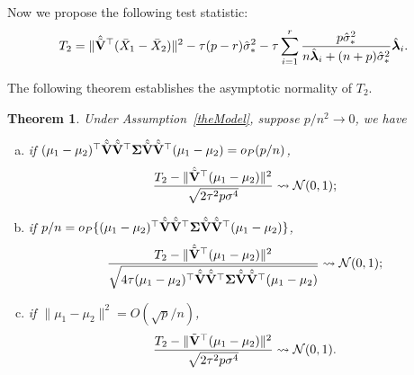 \documentclass[times,sort&compress,3p]{elsarticle}
\newcommand{\bfsym}[1]{\ensuremath{\boldsymbol{#1}}}
\def\blambda {\bfsym {\lambda}}        \def\bLambda {\bfsym {\Lambda}}
\theoremstyle{plain}
\newtheorem{theorem}{\quad\quad Theorem}
\theoremstyle{definition}
\theoremstyle{remark}
\begin{document}
Now we propose the following test statistic:
$$
T_2=
\|\hat{\tilde{\BV}}^\top  (\bar{X}_1-\bar{X}_2)\|^2
-
\tau(p-r)\hat{\sigma}_*^2 
- \tau\sum_{i=1}^r \frac{p\hat{\sigma}_*^2}{n\hat{\blambda}_i+(n+p)\hat{\sigma}_*^2}\hat{\blambda}_i.
$$

The following theorem establishes the asymptotic normality of $T_2$.
\begin{theorem}\label{myPanpan}
    Under Assumption~\ref{theModel},
suppose $p/n^2\to 0$,
    we have
    \begin{enumerate}[(a)]
        \item
 if $(\mu_1-\mu_2)^\top  \hat{\tilde{\BV}}\hat{\tilde{\BV}}^\top  \bSigma\hat{\tilde{\BV}}\hat{\tilde{\BV}}^\top  (\mu_1-\mu_2)=o_P(p/n)$,
\begin{equation*}
    \frac{T_2-\|\hat{\tilde{\mathbf{V}}}^\top (\mu_1-\mu_2)\|^2}{\sqrt{2\tau^2 p\sigma^4}}\rightsquigarrow \mathcal{N}(0,1);
\end{equation*}
        \item
            if $p/n=o_P\{(\mu_1-\mu_2)^\top  \hat{\tilde{\BV}}\hat{\tilde{\BV}}^\top  \bSigma\hat{\tilde{\BV}}\hat{\tilde{\BV}}^\top  (\mu_1-\mu_2)\}$,
\begin{equation*}
    \frac{T_2-\|\hat{\tilde{\BV}}^\top (\mu_1-\mu_2)\|^2}{\sqrt{4\tau (\mu_1-\mu_2)^\top  \hat{\tilde{\BV}}\hat{\tilde{\BV}}^\top  \bSigma\hat{\tilde{\BV}}\hat{\tilde{\BV}}^\top  (\mu_1-\mu_2)}}\rightsquigarrow \mathcal{N}(0,1);
\end{equation*}
        \item
 if $\|\mu_1-\mu_2\|^2=O({\sqrt{p}}/{n})$,
\begin{equation*}
    \frac{T_2-\|\tilde{\mathbf{V}}^\top (\mu_1-\mu_2)\|^2}{\sqrt{2\tau^2 p\sigma^4}}\rightsquigarrow \mathcal{N}(0,1).
\end{equation*}
    \end{enumerate}
\end{theorem} 
\end{document}
